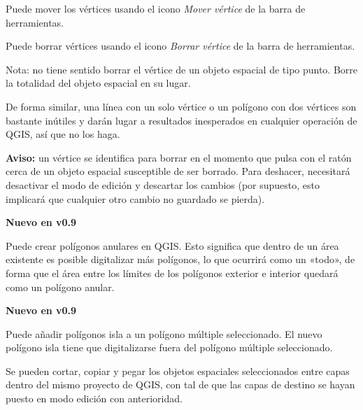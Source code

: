 Puede mover los vértices usando el icono \textit{Mover vértice} de la barra de herramientas.


Puede borrar vértices usando el icono \textit{Borrar vértice} de la barra de herramientas.

Nota: no tiene sentido borrar el vértice de un objeto espacial de tipo punto. Borre la totalidad del objeto espacial en su lugar.

De forma similar, una línea con un solo vértice o un polígono con dos vértices son bastante inútiles y darán lugar a resultados inesperados en cualquier operación de QGIS, así que no los haga.

\textbf{Aviso:} un vértice se identifica para borrar en el momento que pulsa con el ratón cerca de un objeto espacial susceptible de ser borrado. Para deshacer, necesitará desactivar el modo de edición y descartar los cambios (por supuesto, esto implicará que cualquier otro cambio no guardado se pierda).

\textbf{Nuevo en v0.9}

Puede crear polígonos anulares en QGIS. Esto significa que dentro de un área existente es posible digitalizar más polígonos, lo que ocurrirá como un «todo», de forma que el área entre los límites de los polígonos exterior e interior quedará como un polígono anular.

\textbf{Nuevo en v0.9}

Puede añadir polígonos isla a un polígono múltiple seleccionado. El nuevo polígono isla tiene que digitalizarse fuera del polígono múltiple seleccionado.



Se pueden cortar, copiar y pegar los objetos espaciales seleccionados entre capas dentro del mismo proyecto de QGIS, con tal de que las capas de destino se hayan puesto en modo edición con anterioridad.

